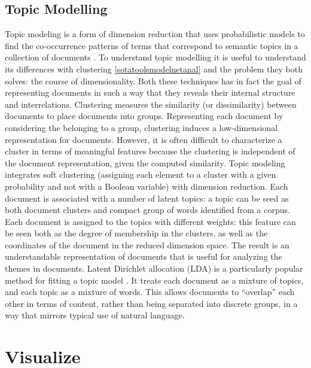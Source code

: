 \documentclass[]{book}
\begin{document}
\subsection{Topic Modelling}\label{sotatoolsmodeltopicmodel}

Topic modeling is a form of dimension reduction that uses probabilistic
models to find the co-occurrence patterns of terms that correspond to
semantic topics in a collection of documents
\citep{crain2012dimensionality}. To understand topic modelling it is
useful to understand its differences with clustering
\ref{sotatoolsmodelnetanal} and the problem they both solves: the course
of dimensionality. Both these techniques has in fact the goal of
representing documents in such a way that they reveals their internal
structure and interrelations. Clustering measures the similarity (or
dissimilarity) between documents to place documents into groups.
Representing each document by considering the belonging to a group,
clustering induces a low-dimensional representation for documents.
However, it is often difficult to characterize a cluster in terms of
meaningful features because the clustering is independent of the
document representation, given the computed similarity. Topic modeling
integrates soft clustering (assigning each element to a cluster with a
given probability and not with a Boolean variable) with dimension
reduction. Each document is associated with a number of latent topics: a
topic can be seed as both document clusters and compact group of words
identified from a corpus. Each document is assigned to the topics with
different weights: this feature can be seen both as the degree of
membership in the clusters, as well as the coordinates of the document
in the reduced dimension space. The result is an understandable
representation of documents that is useful for analyzing the themes in
documents. Latent Dirichlet allocation (LDA) is a particularly popular
method for fitting a topic model \citep{blei2003latent}. It treats each
document as a mixture of topics, and each topic as a mixture of words.
This allows documents to ``overlap'' each other in terms of content,
rather than being separated into discrete groups, in a way that mirrors
typical use of natural language.

\section{Visualize}\label{sotatoolsvisualize}
\end{document}
